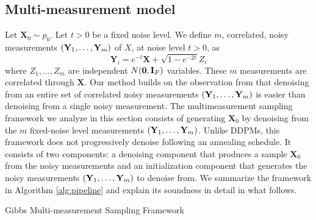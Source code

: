 \subsection{Multi-measurement model}
Let $\mathbf{X}_0 \sim p_0$. Let $t>0$ be a fixed noise level. We define $m$, correlated, noisy measurements $\mathopen{}\left(\mathbf{Y}_1, \dots, \mathbf{Y}_m\right)$ of $X$, at noise level $t >0$, as
\begin{equation}
\mathbf{Y}_i = e^{-t} \mathbf{X} + \sqrt{1 - e^{-2t}} Z_i
\label{eq:multimeasure}
\end{equation}
where $Z_1, \dots, Z_m$ are independent $N\mathopen{}\left(\mathbf{0}, \mathbf{I}_F\right)$ variables. These $m$ measurements are correlated through $\mathbf{X}$. Our method builds on the observation from \cite{saremi_multimeasurement_2021} that denoising from an entire set of correlated noisy measurements $\mathopen{}\left(\mathbf{Y}_1, \dots, \mathbf{Y}_m\right)$ is easier than denoising from a single noisy measurement. The multimeasurement sampling framework we analyze in this section consists of generating $\mathbf{X}_0$ by denoising from the $m$ fixed-noise level measurements $\mathopen{}\left(\mathbf{Y}_1, \dots, \mathbf{Y}_m\right)$. Unlike DDPMs, this framework does not progressively denoise following an annealing schedule. It consists of two components: a denoising component that produces a sample $\mathbf{X}_0$ from the noisy measurements and an initialization component that generates the noisy measurements $\mathopen{}\left(\mathbf{Y}_1, \dots, \mathbf{Y}_m\right)$ to denoise from. We summarize the framework in Algorithm \ref{alg:pipeline} and explain its soundness in detail in what follows.

\begin{algorithm}[H]
\caption{Gibbs Multi-measurement Sampling Framework}
\label{alg:pipeline}
\begin{algorithmic}
\ENDFOR
{}
\end{algorithmic}
\end{algorithm}

